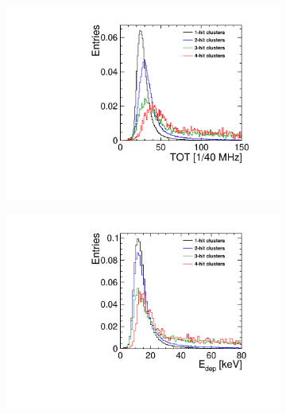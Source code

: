 \begin{figure}[htbp] \centering
  \begin{subfigure}[b]{0.32\textwidth}
    \includegraphics[width=\textwidth]{./figures/Calibration/TOT_Clusters_W0019_L08.pdf}
    \caption{}
  \end{subfigure}\hfill
  \begin{subfigure}[b]{0.32\textwidth}
    \includegraphics[width=\textwidth]{./figures/Calibration/Edep_Clusters_W0019_L08.pdf}
    \caption{}
  \end{subfigure}\hfill
  \begin{subfigure}[b]{0.32\textwidth}

\end{subfigure}
\end{figure}
